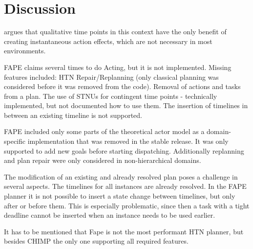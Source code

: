 \section{Discussion}\label{sec:discussion}


\cite{bit-monnotTemporalHierarchicalModels2017} argues that qualitative time points in this context have the only benefit of creating instantaneous action effects, which are not necessary in most environments.

FAPE claims several times to do Acting, but it is not implemented.
Missing features included: 
HTN Repair/Replanning (only classical planning was considered before it was removed from the code). 
Removal of actions and tasks from a plan.
The use of STNUs for contingent time points - technically implemented, but not documented how to use them.
The insertion of timelines in between an existing timeline is not supported.


FAPE included only some parts of the theoretical actor model as a domain-specific implementation that was removed in the stable release.
It was only supported to add new goals before starting dispatching.
Additionally replanning and plan repair were only considered in non-hierarchical domains.

The modification of an existing and already resolved plan poses a challenge in several aspects.
The timelines for all instances are already resolved.
In the FAPE planner it is not possible to insert a state change between timelines, but only after or before them.
This is especially problematic, since then a task with a tight deadline cannot be inserted when an instance needs to be used earlier.


It has to be mentioned that Fape is not the most performant HTN planner, but besides CHIMP the only one supporting all required features.